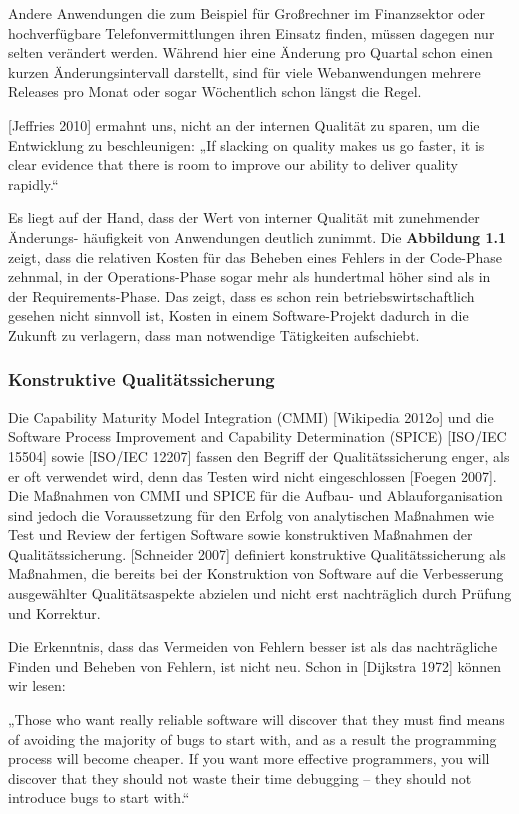 Andere Anwendungen die zum Beispiel für Großrechner im Finanzsektor oder hochverfügbare Telefonvermittlungen ihren Einsatz finden, müssen dagegen nur selten verändert werden. Während hier eine Änderung pro Quartal schon einen kurzen Änderungsintervall darstellt, sind für viele Webanwendungen mehrere Releases pro Monat oder sogar Wöchentlich schon längst die Regel.

[Jeffries 2010] ermahnt uns, nicht an der internen Qualität zu sparen, um die Entwicklung zu
beschleunigen:
„If slacking on quality makes us go faster, it is clear evidence that there is room to
improve our ability to deliver quality rapidly.“

Es liegt auf der Hand, dass der Wert von interner Qualität mit zunehmender Änderungs-
häufigkeit von Anwendungen deutlich zunimmt. Die \textbf{Abbildung 1.1} zeigt, dass die relativen
Kosten für das Beheben eines Fehlers in der Code-Phase zehnmal, in der Operations-Phase
sogar mehr als hundertmal höher sind als in der Requirements-Phase. Das zeigt, dass 
es schon rein betriebswirtschaftlich gesehen nicht sinnvoll ist, Kosten in einem Software-Projekt
dadurch in die Zukunft zu verlagern, dass man notwendige Tätigkeiten aufschiebt.

\subsubsection{Konstruktive Qualitätssicherung}
Die Capability Maturity Model Integration (CMMI) [Wikipedia 2012o] und die Software Process Improvement and Capability Determination (SPICE) [ISO/IEC 15504] sowie [ISO/IEC 12207] fassen den Begriff der Qualitätssicherung enger, als er oft verwendet wird, denn das Testen wird nicht eingeschlossen [Foegen 2007]. Die Maßnahmen von CMMI und SPICE für die Aufbau- und Ablauforganisation sind jedoch die Voraussetzung für den Erfolg von analytischen Maßnahmen wie Test und Review der fertigen Software sowie konstruktiven Maßnahmen der Qualitätssicherung. [Schneider 2007] definiert konstruktive
Qualitätssicherung als Maßnahmen, die bereits bei der Konstruktion von Software auf die
Verbesserung ausgewählter Qualitätsaspekte abzielen und nicht erst nachträglich durch
Prüfung und Korrektur.

Die Erkenntnis, dass das Vermeiden von Fehlern besser ist als das nachträgliche Finden
und Beheben von Fehlern, ist nicht neu. Schon in [Dijkstra 1972] können wir lesen:

„Those who want really reliable software will discover that they must find means of
avoiding the majority of bugs to start with, and as a result the programming process
will become cheaper. If you want more effective programmers, you will discover that
they should not waste their time debugging – they should not introduce bugs to start
with.“

